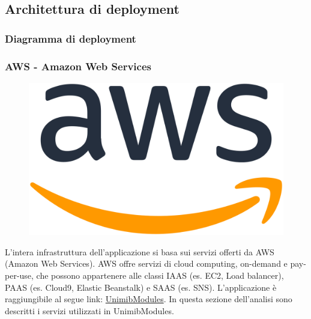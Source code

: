 \documentclass[12pt]{article}
\begin{document}
\subsection{Architettura di deployment}
\subsubsection{Diagramma di deployment}
\subsubsection{AWS - Amazon Web Services}
\begin{figure}[H]
\includegraphics[scale=0.08, left]{aws-logo.png}
\end{figure}
L'intera infrastruttura dell'applicazione si basa sui servizi offerti da AWS (Amazon Web Services). AWS offre servizi di cloud computing, on-demand e pay-per-use, che possono appartenere alle classi IAAS (es. EC2, Load balancer), PAAS (es. Cloud9, Elastic Beanstalk) e SAAS (es. SNS). L'applicazione è raggiungibile al segue link: \textcolor{blue}{\href{http://unimibquestionari-env.eba-3behr9mi.eu-central-1.elasticbeanstalk.com/}{UnimibModules}}. In questa sezione dell'analisi sono descritti i servizi utilizzati in UnimibModules. 
\end{document}
